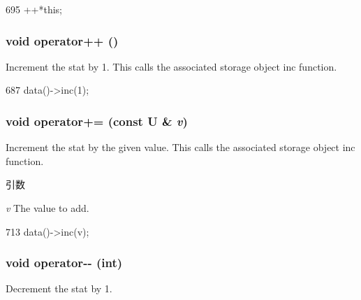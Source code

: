 \begin{DoxyCode}
695 { ++*this; }
\end{DoxyCode}
\hypertarget{classStats_1_1ScalarBase_a00f008b80917746917b874d00abd02a9}{
\subsubsection[{operator++}]{\setlength{\rightskip}{0pt plus 5cm}void operator++ ()}}
\label{classStats_1_1ScalarBase_a00f008b80917746917b874d00abd02a9}
Increment the stat by 1. This calls the associated storage object inc function. 


\begin{DoxyCode}
687 { data()->inc(1); }
\end{DoxyCode}
\hypertarget{classStats_1_1ScalarBase_a057ed2b8eaf6c5c5bad1c143d8449cb6}{
\subsubsection[{operator+=}]{\setlength{\rightskip}{0pt plus 5cm}void operator+= (const U \& {\em v})}}
\label{classStats_1_1ScalarBase_a057ed2b8eaf6c5c5bad1c143d8449cb6}
Increment the stat by the given value. This calls the associated storage object inc function. 
\begin{DoxyParams}{引数}
\item[{\em v}]The value to add. \end{DoxyParams}



\begin{DoxyCode}
713 { data()->inc(v); }
\end{DoxyCode}
\hypertarget{classStats_1_1ScalarBase_a132d549c024fd011da9b2f96319c5395}{
\subsubsection[{operator-\/-\/}]{\setlength{\rightskip}{0pt plus 5cm}void operator-\/-\/ (int)}}
\label{classStats_1_1ScalarBase_a132d549c024fd011da9b2f96319c5395}
Decrement the stat by 1. 


